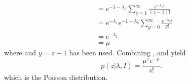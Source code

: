 \begin{example}
\begin{equation}
\begin{split}
			& = e^{-1-\lambda_0} \sum_{z=1}^{\infty} \frac{e^{-\lambda_1 z}}{(z-1)!}\\
			& = e^{-\lambda_1} e^{-1-\lambda_0}\sum_{y=0}^{\infty} \frac{e^{-\lambda_1 y}}{y!}\\
			& = e^{-\lambda_1}\\
			& = \mu
		\end{split}
		\label{eq:qty}
	\end{equation}
	where  and $y = z-1$ has been used. Combining ,  and  yield
	\begin{equation}
		p(z|\lambda,I) = \frac{\mu^ze^{-\mu }}{z!} .
	\end{equation}
	which is the Poisson distribution.
\end{example}


